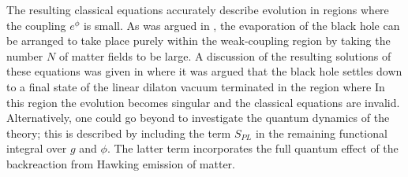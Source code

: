 The resulting classical equations
%
\eqn{}
%
accurately describe evolution in regions where the coupling $e^\phi$ is
small.
As was argued in \CGHS, the evaporation of the black
hole can be arranged to take place purely within the weak-coupling region
by taking the number $N$ of  matter fields to be large.  A discussion of
the resulting solutions of these equations was given in
 where it was argued that the black hole settles
down to a final state of the linear dilaton vacuum terminated in the
region where
%
\eqn{}
%
In this region the evolution becomes singular and the classical equations
are invalid.
Alternatively, one could go beyond to investigate the quantum dynamics of the
theory; this is described by including the term $S_{PL}$ in the remaining
functional
integral over $g$ and $\phi$. The latter term incorporates the full quantum
effect of the backreaction from Hawking emission of matter.
%
%
%
